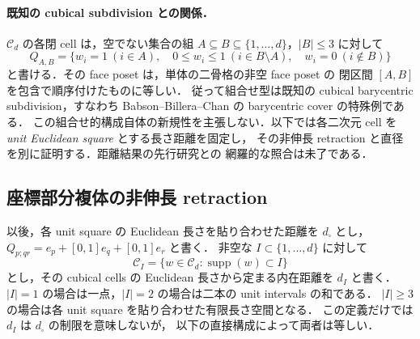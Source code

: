 \paragraph{既知の cubical subdivision との関係．}
\label{topo:cubical-barycentric-comparison}
$\mathcal C_d$ の各閉 cell は，空でない集合の組
$A\subseteq B\subseteq\{1,\ldots,d\}$，$|B|\le3$ に対して
\[
 Q_{A,B}=\{w_i=1\ (i\in A),\quad 0\le w_i\le1\ (i\in B\setminus A),
 \quad w_i=0\ (i\notin B)\}
\]
と書ける．その face poset は，単体の二骨格の非空 face poset の
閉区間 $[A,B]$ を包含で順序付けたものに等しい．
従って組合せ型は既知の cubical barycentric subdivision，すなわち
Babson--Billera--Chan\cite[1996年preprint, \S2.3, Proposition~2.2, Corollary~2.4]{BabsonBilleraChan}
の barycentric cover の特殊例である．
この組合せ的構成自体の新規性を主張しない．以下では各二次元 cell を
\emph{unit Euclidean square} とする長さ距離を固定し，
その非伸長 retraction と直径を別に証明する．距離結果の先行研究との
網羅的な照合は未了である．

\subsection{座標部分複体の非伸長 retraction}

以後，各 unit square の Euclidean 長さを貼り合わせた距離を $d_\square$ とし，
$Q_{p;qr}=e_p+[0,1]e_q+[0,1]e_r$ と書く．
非空な $I\subset\{1,\ldots,d\}$ に対して
\[
 \mathcal C_I=\{w\in\mathcal C_d:\operatorname{supp}(w)\subset I\}
\]
とし，その cubical cells の Euclidean 長さから定まる内在距離を $d_I$ と書く．
$|I|=1$ の場合は一点，$|I|=2$ の場合は二本の unit intervals の和である．
$|I|\ge3$ の場合は各 unit square を貼り合わせた有限長さ空間となる．
この定義だけでは $d_I$ は $d_\square$ の制限を意味しないが，
以下の直接構成によって両者は等しい．

